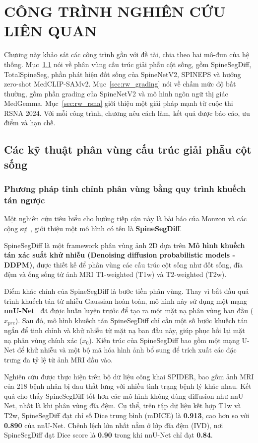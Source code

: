 \chapter{CÔNG TRÌNH NGHIÊN CỨU LIÊN QUAN}

Chương này khảo sát các công trình gần với đề tài, chia theo hai mô-đun của hệ thống. Mục~\ref{sec:rw_seg} nói về phân vùng cấu trúc giải phẫu cột sống, gồm SpineSegDiff, TotalSpineSeg, phần phát hiện đốt sống của SpineNetV2, SPINEPS và hướng zero-shot MedCLIP-SAMv2. Mục~\ref{sec:rw_grading} nói về chấm mức độ bất thường, gồm phần grading của SpineNetV2 và mô hình ngôn ngữ thị giác MedGemma. Mục~\ref{sec:rw_rsna} giới thiệu một giải pháp mạnh từ cuộc thi RSNA 2024. Với mỗi công trình, chương nêu cách làm, kết quả được báo cáo, ưu điểm và hạn chế.

\section{Các kỹ thuật phân vùng cấu trúc giải phẫu cột sống}
\label{sec:rw_seg}
\subsection{Phương pháp tinh chỉnh phân vùng bằng quy trình khuếch tán ngược}
Một nghiên cứu tiêu biểu cho hướng tiếp cận này là bài báo của Monzon và các cộng sự~\cite{monzon2024diffusion}, giới thiệu một mô hình có tên là \textbf{SpineSegDiff}.

SpineSegDiff là một framework phân vùng ảnh 2D dựa trên \textbf{Mô hình khuếch tán xác suất khử nhiễu (Denoising diffusion probabilistic models - DDPM)}, được thiết kế để phân vùng các cấu trúc cột sống như đốt sống, đĩa đệm và ống sống từ ảnh MRI T1-weighted (T1w) và T2-weighted (T2w).

Điểm khác chính của SpineSegDiff là bước tiền phân vùng. Thay vì bắt đầu quá trình khuếch tán từ nhiễu Gaussian hoàn toàn, mô hình này sử dụng một mạng \textbf{nnU-Net}~\cite{isensee2021nnunet} đã được huấn luyện trước để tạo ra một mặt nạ phân vùng ban đầu ($\hat{x}_{pre}$). Sau đó, mô hình khuếch tán SpineSegDiff chỉ cần một số bước khuếch tán ngắn để tinh chỉnh và khử nhiễu từ mặt nạ ban đầu này, giúp phục hồi lại mặt nạ phân vùng chính xác ($x_0$). Kiến trúc của SpineSegDiff bao gồm một mạng U-Net để khử nhiễu và một bộ mã hóa hình ảnh bổ sung để trích xuất các đặc trưng đa tỷ lệ từ ảnh MRI đầu vào.

Nghiên cứu được thực hiện trên bộ dữ liệu công khai SPIDER, bao gồm ảnh MRI của 218 bệnh nhân bị đau thắt lưng với nhiều tình trạng bệnh lý khác nhau. Kết quả cho thấy SpineSegDiff tốt hơn các mô hình không dùng diffusion như nnU-Net, nhất là khi phân vùng đĩa đệm. Cụ thể, trên tập dữ liệu kết hợp T1w và T2w, SpineSegDiff đạt chỉ số Dice trung bình (mDICE) là \textbf{0.913}, cao hơn so với \textbf{0.890} của nnU-Net. Chênh lệch lớn nhất nằm ở lớp đĩa đệm (IVD), nơi SpineSegDiff đạt Dice score là \textbf{0.90} trong khi nnU-Net chỉ đạt \textbf{0.84}.


